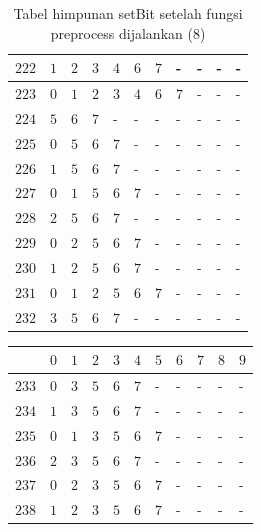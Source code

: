 \begin{appendices}
\begin{table}[H]
\begin{tabular} {|l|l|l|l|l|l|l|l|l|l|l|}
  		$ 222 $ & $ 1 $ &$ 2 $ &$ 3 $ &$ 4 $ &$ 6 $ &$ 7 $ & - &  - &  - &  -   \\ \hline
  		$ 223 $ & $ 0 $ &$ 1 $ &$ 2 $ &$ 3 $ &$ 4 $ &$ 6 $ &$ 7 $ & - &  - &  -   \\ \hline
  		$ 224 $ & $ 5 $ &$ 6 $ &$ 7 $ & - &  - &  - &  - &  - &  - &  -   \\ \hline
  		$ 225 $ & $ 0 $ &$ 5 $ &$ 6 $ &$ 7 $ & - &  - &  - &  - &  - &  -   \\ \hline
  		$ 226 $ & $ 1 $ &$ 5 $ &$ 6 $ &$ 7 $ & - &  - &  - &  - &  - &  -   \\ \hline
  		$ 227 $ & $ 0 $ &$ 1 $ &$ 5 $ &$ 6 $ &$ 7 $ & - &  - &  - &  - &  -   \\ \hline
  		$ 228 $ & $ 2 $ &$ 5 $ &$ 6 $ &$ 7 $ & - &  - &  - &  - &  - &  -   \\ \hline
  		$ 229 $ & $ 0 $ &$ 2 $ &$ 5 $ &$ 6 $ &$ 7 $ & - &  - &  - &  - &  -   \\ \hline
  		$ 230 $ & $ 1 $ &$ 2 $ &$ 5 $ &$ 6 $ &$ 7 $ & - &  - &  - &  - &  -   \\ \hline
  		$ 231 $ & $ 0 $ &$ 1 $ &$ 2 $ &$ 5 $ &$ 6 $ &$ 7 $ & - &  - &  - &  -   \\ \hline
  		$ 232 $ & $ 3 $ &$ 5 $ &$ 6 $ &$ 7 $ & - &  - &  - &  - &  - &  -   \\ \hline  		
  	\end{tabular}\caption{Tabel himpunan setBit setelah fungsi preprocess dijalankan (8)}
  	\label{tab:setbit_8}
  \end{table}
  \begin{table}[H]
  	\centering
  	\begin{tabular} {|l|l|l|l|l|l|l|l|l|l|l|} \hline
  		\backslashbox{$Num$}{$index$} & $ 0 $ & $ 1 $ & $ 2 $ & $ 3 $ & $ 4 $ & $ 5 $ & $ 6 $ & $ 7 $ & $ 8 $ & $ 9 $ \\ \hline
  		$ 233 $ & $ 0 $ &$ 3 $ &$ 5 $ &$ 6 $ &$ 7 $ & - &  - &  - &  - &  -   \\ \hline
  		$ 234 $ & $ 1 $ &$ 3 $ &$ 5 $ &$ 6 $ &$ 7 $ & - &  - &  - &  - &  -   \\ \hline
  		$ 235 $ & $ 0 $ &$ 1 $ &$ 3 $ &$ 5 $ &$ 6 $ &$ 7 $ & - &  - &  - &  -   \\ \hline
  		$ 236 $ & $ 2 $ &$ 3 $ &$ 5 $ &$ 6 $ &$ 7 $ & - &  - &  - &  - &  -   \\ \hline
  		$ 237 $ & $ 0 $ &$ 2 $ &$ 3 $ &$ 5 $ &$ 6 $ &$ 7 $ & - &  - &  - &  -   \\ \hline
  		$ 238 $ & $ 1 $ &$ 2 $ &$ 3 $ &$ 5 $ &$ 6 $ &$ 7 $ & - &  - &  - &  -   \\ \hline

\end{tabular}
\end{table}
\end{appendices}
